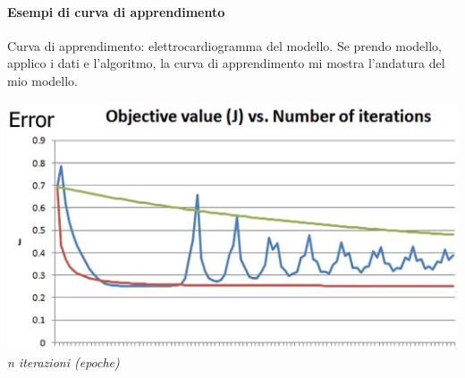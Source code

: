 \documentclass[10pt]{book}
\begin{document}
\paragraph{Esempi di curva di apprendimento} Curva di apprendimento: elettrocardiogramma del modello. Se prendo modello, applico i dati e l'algoritmo, la curva di apprendimento mi mostra l'andatura del mio modello.
\begin{center}
	\includegraphics[scale=0.75]{curveappre.png}\\
	\textit{n iterazioni (epoche)}
\end{center}
\end{document}
